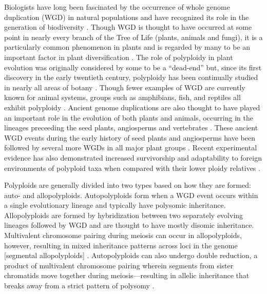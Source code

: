\documentclass[11pt,english,letterpaper,oneside]{article}
\begin{document}
Biologists have long been fascinated by the occurrence of whole genome duplication (WGD) in natural populations and have recognized its role in the generation of biodiversity \citep{ClausKeckHies1940,StebbinsVariationEvolution,GrantPlantSpeciation,otto2000polyploidy}. Though WGD is thought to have occurred at some point in nearly every branch of the Tree of Life (plants, animals and fungi), it is a particularly common phenomenon in plants and is regarded by many to be an important factor in plant diversification \citep{wood2009polyploid,soltisd2009diversification,scarpino2014polyploid}. The role of polyploidy in plant evolution was originally considered by some to be a ``dead-end'' \citep{StebbinsVariationEvolution,wagner1970noise,soltisd2014stebbins} but, since its first discovery in the early twentieth century, polyploidy has been continually studied in nearly all areas of botany \citep{winge1917polyploidy,Winkler1916polyploidy,ClausKeckHies1945polyploidy,GrantPlantSpeciation,StebbinsVariationEvolution,soltisD2003polyploid,soltisd2010polyploidUnknowns,soltai2009roleOfHybridization,ramsey2014polEcoProcRoySoc}. Though fewer examples of WGD are currently known for animal systems, groups such as amphibians, fish, and reptiles all exhibit polyploidy \citep{allendorf1984tetraploidFish,gregory2005polyploidyAnimals}. Ancient genome duplications are also thought to have played an important role in the evolution of both plants and animals, occurring in the lineages preceeding the seed plants, angiosperms and vertebrates \citep{ohno1970geneDuplication,otto2000polyploidy,furlong2001animalOctoploid,jiao2011ancientWGD}. These ancient WGD events during the early history of seed plants and angiosperms have been followed by several more WGDs in all major plant groups \citep{cui2006genomeDuplication,scarpino2014polyploid,canon2014polyploidyLegumes}. Recent experimental evidence has also demonstrated increased survivorship and adaptability to foreign environments of polyploid taxa when compared with their lower ploidy relatives \citep{ramsey2011polyploidEcology,Selmecki2015yeastAdaptation}.
\medskip

Polyploids are generally divided into two types based on how they are formed: auto- and allopolyploids. Autopolyploids form when a WGD event occurs within a single evolutionary lineage and typically have polysomic inheritance. Allopolyploids are formed by hybridization between two separately evolving lineages followed by WGD and are thought to have mostly disomic inheritance. Multivalent chromosome pairing during meiosis can occur in allopolyploids, however, resulting in mixed inheritance patterns across loci in the genome [segmental allopolyploids] \citep{StebbinsVariationEvolution}. Autopolyploids can also undergo double reduction, a product of multivalent chromosome pairing wherein segments from sister chromatids move together during meiosis---resulting in allelic inheritance that breaks away from a strict pattern of polysomy \citep{haldane1930autopolyploids}. 
\medskip
\end{document}
